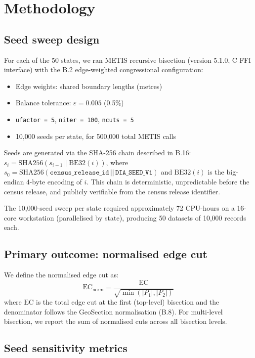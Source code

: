 \section{Methodology}
\label{sec:methodology}

\subsection{Seed sweep design}

For each of the 50 states, we ran METIS recursive bisection (version 5.1.0,
C FFI interface) with the B.2 edge-weighted congressional configuration:
\begin{itemize}
  \item Edge weights: shared boundary lengths (metres)
  \item Balance tolerance: $\varepsilon = 0.005$ (0.5\%)
  \item \texttt{ufactor = 5}, \texttt{niter = 100}, \texttt{ncuts = 5}
  \item 10,000 seeds per state, for 500,000 total METIS calls
\end{itemize}

Seeds are generated via the SHA-256 chain described in B.16:
$s_i = \mathrm{SHA256}(s_{i-1} \,||\, \mathrm{BE32}(i))$, where
$s_0 = \mathrm{SHA256}(\mathtt{census\_release\_id} \,||\, \mathtt{DIA\_SEED\_V1})$
and $\mathrm{BE32}(i)$ is the big-endian 4-byte encoding of $i$.
This chain is deterministic, unpredictable before the census release, and
publicly verifiable from the census release identifier.

The 10,000-seed sweep per state required approximately 72 CPU-hours on
a 16-core workstation (parallelised by state), producing 50 datasets of
10,000 records each.

\subsection{Primary outcome: normalised edge cut}

We define the normalised edge cut as:
\[
  \mathrm{EC}_{\mathrm{norm}} = \frac{\mathrm{EC}}{\sqrt{\min(|P_1|, |P_2|)}}
\]
where $\mathrm{EC}$ is the total edge cut at the first (top-level) bisection
and the denominator follows the GeoSection normalisation (B.8).
For multi-level bisection, we report the sum of normalised cuts across all
bisection levels.

\subsection{Seed sensitivity metrics}

